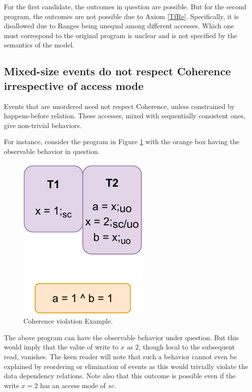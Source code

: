         For the first candidate, the outcomes in question are possible.
        But for the second program, the outcomes are not possible due to Axiom \ref{TfRe}.
        Specifically, it is disallowed due to Ranges being unequal among different accesses. 
        Which one must correspond to the original program is unclear and is not specified by the semantics of the model.

    \subsection{Mixed-size events do not respect Coherence irrespective of access mode}

        Events that are unordered need not respect Coherence, unless constrained by happens-before relation.
        These accesses, mixed with sequentially consistent ones, give non-trivial behaviors.

        For instance, consider the program in Figure \ref{crit:coherence} with the orange box having the observable behavior in question.
        \begin{figure}[H]
            \centering
            \includegraphics[scale=0.7]{6.ConclusionFutureWork/CoherenceNormal.pdf}
            \caption{Coherence violation Example.}
            \label{crit:coherence}
        \end{figure}

        The above program can have the observable behavior under question.
        But this would imply that the value of write to $x$ as $2$, though local to the subsequent read, vanishes. 
        The keen reader will note that such a behavior cannot even be explained by reordering or elimination of events as this would trivially violate the data dependency relations.
        Note also that this outcome is possible even if the write $x=2$ has an access mode of $sc$. 

